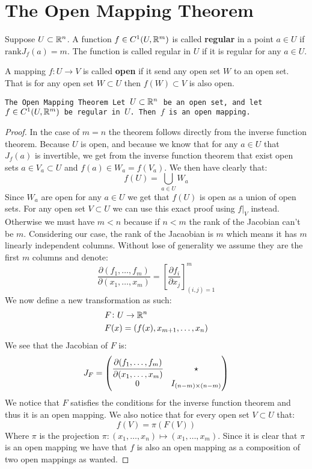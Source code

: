 \documentclass[11pt,a4paper]{article}
\begin{document}
\section{The Open Mapping Theorem}
\begin{definition}
  Suppose $U \subset \mathbb{R}^n$. A function $f \in C^1(U, \mathbb{R}^m)$ is called 
  \textbf{regular} in a point $a \in U$ if $\mathrm{rank}J_f(a) = m$.
  The function is called regular in $U$ if it is regular for any
  $a \in U$.
\end{definition}
\begin{definition}
  A mapping $f \colon U \to V$ is called \textbf{open} if it send
  any open set $W$ to an open set. That is for any open set 
  $W \subset U$ then $f(W) \subset V$ is also open.
\end{definition}
\begin{theorem}
  \tt{The Open Mapping Theorem}
  Let $U \subset \mathbb{R}^n$ be an open set, and let $f \in C^1(U,\mathbb{R}^m)$ be 
  regular in $U$. Then $f$ is an open mapping.
\end{theorem}
\begin{proof}
  In the case of $m = n$ the theorem follows directly from the inverse
  function theorem. Because $U$ is open, and because we know that
  for any $a \in U$ that $J_f(a)$ is invertible, we get from the
  inverse function theorem that exist open sets $a \in V_a \subset U$ 
  and $f(a) \in W_a = f(V_a)$. We then have clearly that:
  \[
    f(U) = \bigcup_{a \in U} W_a
  \]
  Since $W_a$ are open for any $a \in U$ we get that $f(U)$ is open
  as a union of open sets. For any open set $V \subset U$ we can
  use this exact proof using $f\vert_V$ instead. \\
  Otherwise we must have $m < n$ because if $n < m$ the rank of the
  Jacobian can't be $m$. Considering our case, the rank of the Jacaobian
  is $m$ which means it has $m$ linearly independent columns. Without
  lose of generality we assume they are the first $m$ columns and 
  denote:
  \[
    \frac{\partial(f_1,\dots,f_m)}{\partial(x_1,\dots,x_m)} = 
    \left[\frac{\partial f_i}{\partial x_j}\right]_{(i,j)=1}^{m}
  \]
  We now define a new transformation as such:
  \begin{align*}
    &F \colon U \to \mathbb{R}^n \\
    &F(x) = (f(x),x_{m+1},\dots,x_{n})
  \end{align*}
  We see that the Jacobian of $F$ is:
  \[
    J_F = \begin{pmatrix}
\cfrac{\partial(f_1,\dots,f_m)}{\partial(x_1,\dots,x_m)} & \star \\
0 & I_{(n-m) \times (n-m)}\\
      \end{pmatrix}
  \]
  We notice that $F$ satisfies the conditions for the inverse function
  theorem and thus it is an open mapping. We also notice that for
  every open set $V \subset U$ that:
  \[
    f(V) = \pi(F(V))
  \]
  Where $\pi$ is the projection 
  $\pi \colon (x_1,\dots,x_n) \mapsto (x_1,\dots,x_m)$. Since
  it is clear that $\pi$ is an open mapping we have that $f$
  is also an open mapping as a composition of two open mappings as
  wanted.
\end{proof}
\end{document}
